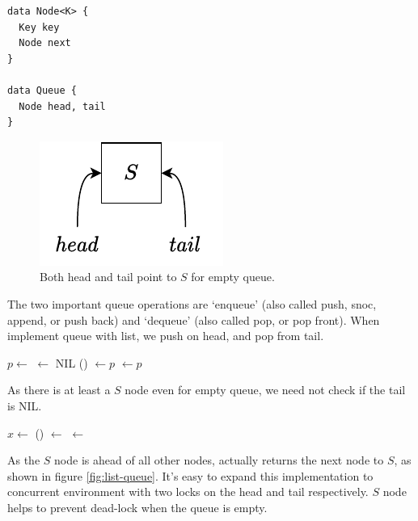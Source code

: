 \documentclass[b5paper]{article}
\begin{document}
\lstset{frame = single}
\begin{lstlisting}[language = Bourbaki]
data Node<K> {
  Key key
  Node next
}

data Queue {
  Node head, tail
}
\end{lstlisting}

\begin{figure}[htbp]
  \centering
  \includegraphics[scale=0.6]{img/empty-list}
  \caption{Both head and tail point to $S$ for empty queue.}
  \label{fig:empty-list}
\end{figure}

The two important queue operations are `enqueue' (also called push, snoc, append, or push back) and `dequeue' (also called pop, or pop front). When implement queue with list, we push on head, and pop from tail.

\begin{algorithmic}[1]
  \State $p \gets $ 
  \State {} $\gets$ NIL
  \State {}() $\gets p$
  \State {} $\gets p$
\EndFunction
\end{algorithmic}

As there is at least a $S$ node even for empty queue, we need not check if the tail is NIL.

\begin{algorithmic}[1]
  \State $x \gets $ 
  \State {}() $\gets$ 
   
    \State {} $\gets$ 
  \EndIf
  \State \Return {}
\EndFunction
\end{algorithmic}

As the $S$ node is ahead of all other nodes,  actually returns the next node to $S$, as shown in figure \ref{fig:list-queue}. It's easy to expand this implementation to concurrent environment with two locks on the head and tail respectively. $S$ node helps to prevent dead-lock when the queue is empty\cite{PODC96}\cite{SutterDDJ}.
\end{document}
